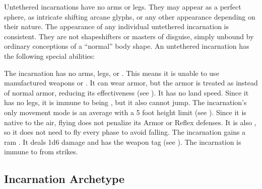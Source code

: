   Untethered incarnations have no arms or legs.
  They may appear as a perfect sphere, as intricate shifting arcane glyphs, or any other appearance depending on their nature.
  The appearance of any individual untethered incarnation is consistent.
  They are not shapeshifters or masters of disguise, simply unbound by ordinary conceptions of a ``normal'' body shape.
  An untethered incarnation has the following special abilities:
  \begin{raggeditemize}
     The incarnation has no arms, legs, or .
      This means it is unable to use manufactured weapons or .
      It can wear armor, but the armor is treated as  instead of normal armor, reducing its effectiveness (see ).
      It has no land speed.
      Since it has no legs, it is immune to being \prone, but it also cannot jump.
     The incarnation's only movement mode is an average  with a 5 foot height limit (see ).
      Since it is native to the air, flying does not penalize its Armor or Reflex defenses.
      It is also , so it does not need to fly every phase to avoid falling.
     The incarnation gains a ram .
      It deals 1d6 damage and has the  weapon tag (see ).
     The incarnation is immune to  from strikes.
  \end{raggeditemize}

  \subsection{Incarnation Archetype}

